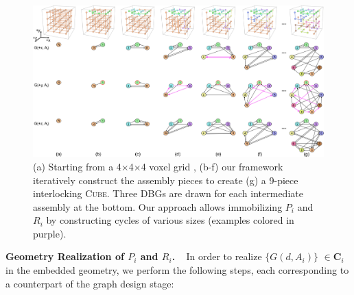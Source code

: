 \begin{figure}[!t]
	\centering
	\includegraphics[width=17.7cm]{images/Application_Puzzle_Cube.png}
	\vspace*{-3.5mm}
	\caption{(a) Starting from a 4$\times$4$\times$4  voxel grid , (b-f) our framework iteratively construct the assembly pieces to create (g) a 9-piece interlocking {\textsc{Cube}}.
		Three DBGs are drawn for each intermediate assembly at the bottom.
		Our approach allows immobilizing $P_i$ and $R_i$ by constructing cycles of various sizes (examples colored in purple).
	}
	\vspace*{-2.0mm}
	\label{fig:Application_Puzzle_Cube}
\end{figure}


\vspace*{1.0mm}
\noindent
{\bf Geometry Realization of $P_i$ and $R_i$.}  \
In order to realize $\{G(d, A_i)\}$ $\in \mathbf{C}_i$ in the embedded geometry, 
we perform the following steps, each corresponding to a counterpart of the graph design stage:

